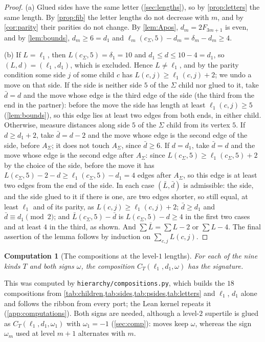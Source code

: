 \documentclass[11pt]{amsart}
\newtheorem{computation}[theorem]{Computation}
\theoremstyle{definition}
\theoremstyle{remark}
\newcommand{\code}[1]{\texttt{#1}}
\newcommand{\Fib}{F}
\begin{document}
\begin{proof}
(a) Glued sides have the same letter (\cref{sec:lengths}), so by \cref{prop:letters} the same length. By
\cref{prop:fib} the letter lengths do not decrease with $m$, and by \cref{cor:parity} their parities do not change. By
\cref{lem:Apos}, $d_m=2\Fib_{3m+1}$ is even, and by \cref{lem:bounds}, $d_m\ge6=d_1$ and
$\ell_m(c_\Sigma,5)-d_m=\delta_m-d_m\ge4$.

(b) If $L=\ell_1$, then $L(c_\Sigma,5)=\delta_1=10$ and $d_1\le d\le 10-4=d_1$, so $(L,d)=(\ell_1,d_1)$, which is
excluded. Hence $L\neq\ell_1$, and by the parity condition some side $j$ of some child $c$ has
$L(c,j)\ge\ell_1(c,j)+2$; we undo a move on that side. If the side is neither side $5$ of the $\Sigma$ child nor glued
to it, take $\bar d=d$ and the move whose edge is the third edge of the side (the third from the end in the partner):
before the move the side has length at least $\ell_1(c,j)\ge5$ (\cref{lem:bounds}), so this edge lies at least two
edges from both ends, in either child. Otherwise, measure distances along side $5$ of the $\Sigma$ child from its
vertex $5$. If $d\ge d_1+2$, take $\bar d=d-2$ and the move whose edge is the second edge of the side, before
$A_\Sigma$; it does not touch $A_\Sigma$, since $\bar d\ge6$. If $d=d_1$, take $\bar d=d$ and the move whose edge is the
second edge after $A_\Sigma$: since $L(c_\Sigma,5)\ge\ell_1(c_\Sigma,5)+2$ by the choice of the side, before the move
it has $L(c_\Sigma,5)-2-d\ge\ell_1(c_\Sigma,5)-d_1=4$ edges after $A_\Sigma$, so this edge is at least two edges from
the end of the side. In each case $(\bar L,\bar d)$ is admissible: the side, and the side glued to it if there is one, are two edges
shorter, so still equal, at least $\ell_1$ and of its parity, as $L(c,j)\ge\ell_1(c,j)+2$; $\bar d\ge d_1$ and
$\bar d\equiv d_1\pmod2$; and $\bar L(c_\Sigma,5)-\bar d$ is $L(c_\Sigma,5)-d\ge4$ in the first two cases and at least $4$
in the third, as shown. And $\sum\bar L=\sum L-2$ or $\sum L-4$. The final
assertion of the lemma follows by induction on $\sum_{c,j}L(c,j)$.
\end{proof}

\begin{computation}[The compositions at the level-$1$ lengths]\label{comp:compose}
For each of the nine kinds $T$ and both signs $\omega$, the composition $C_T(\ell_1,d_1,\omega)$ has the signature.
\end{computation}

This was computed by \code{hierarchy/compositions.py}, which builds the $18$ compositions from
\cref{tab:children,tab:sides,tab:psides,tab:letters} and $\ell_1$, $d_1$ alone and follows the ribbon from every port;
the Lean kernel repeats it (\cref{app:computations}). Both signs are needed, although a level-$2$ supertile is glued as
$C_T(\ell_1,d_1,\omega_1)$ with $\omega_1=-1$ (\cref{sec:comp}): moves keep $\omega$, whereas the sign $\omega_m$ used
at level $m+1$ alternates with $m$.
\end{document}
